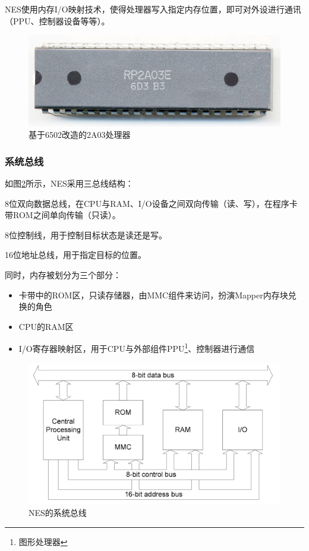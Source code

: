 \documentclass[a4paper]{ltxdoc}
\begin{document}
{NES使用内存I/O映射技术，使得处理器写入指定内存位置，即可对外设进行通讯（PPU、控制器设备等等）。

\begin{figure}[h]
	\centering
	\includegraphics{images/RP2A03E.jpg}
	\caption{基于6502改造的2A03处理器}
	\label{fig:2a03}
\end{figure}

\subsubsection{系统总线}
如图\ref{fig:system_bus}所示，NES采用三总线结构：
\begin{description}[align=left]
	\item [数据总线] 8位双向数据总线，在CPU与RAM、I/O设备之间双向传输（读、写），在程序卡带ROM之间单向传输（只读）。
	\item [控制总线] 8位控制线，用于控制目标状态是读还是写。
	\item [地址总线] 16位地址总线，用于指定目标的位置。
\end{description}

同时，内存被划分为三个部分：
\begin{itemize}
	\item 卡带中的ROM区，只读存储器，由MMC组件来访问，扮演Mapper内存块兑换的角色
	\item CPU的RAM区
	\item I/O寄存器映射区，用于CPU与外部组件PPU\footnote{图形处理器}、控制器进行通信
\end{itemize}

\begin{figure}[h]
	\centering
	\includegraphics[width=\textwidth]{images/system_bus.png}
	\caption{NES的系统总线}
	\label{fig:system_bus}
\end{figure}

}
\end{document}
